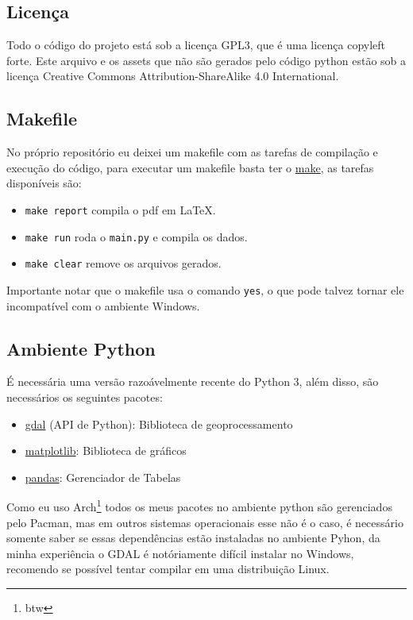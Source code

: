 \documentclass{article}
\begin{document}
\subsection{Licença}
\par
Todo o código do projeto está sob a licença GPL3, que é uma licença copyleft forte. Este arquivo e
os assets que não são gerados pelo código python estão sob a licença Creative Commons
Attribution-ShareAlike 4.0 International.
\subsection{Makefile}
\par
No próprio repositório eu deixei um makefile com as tarefas de compilação e 
execução do código, para executar um makefile basta ter o \href{https://www.gnu.org/software/make/}{make},
as tarefas disponíveis são:
\begin{itemize}
\item\verb|make report| compila o pdf em LaTeX.
\item\verb|make run| roda o \verb|main.py| e compila os dados.
\item\verb|make clear| remove os arquivos gerados.
\end{itemize}
\par
Importante notar que o makefile usa o comando \verb|yes|, o que pode talvez tornar ele
incompatível com o ambiente Windows.
\subsection{Ambiente Python}
\par É necessária uma versão razoávelmente recente do Python 3, além disso, são necessários
os seguintes pacotes:
\begin{itemize}
\item\href{https://gdal.org/en/stable/}{gdal} (API de Python): Biblioteca de geoprocessamento
\item\href{https://matplotlib.org/}{matplotlib}: Biblioteca de gráficos
\item\href{https://pandas.pydata.org/}{pandas}: Gerenciador de Tabelas
\end{itemize}

\par Como eu uso Arch\footnote{btw} todos os meus pacotes no ambiente python são gerenciados
pelo Pacman, mas em outros sistemas operacionais esse não é o caso, é necessário somente saber
se essas dependências estão instaladas no ambiente Pyhon, da minha experiência o GDAL é notóriamente
difícil instalar no Windows, recomendo se possível tentar compilar em uma distribuição Linux.
\end{document}
